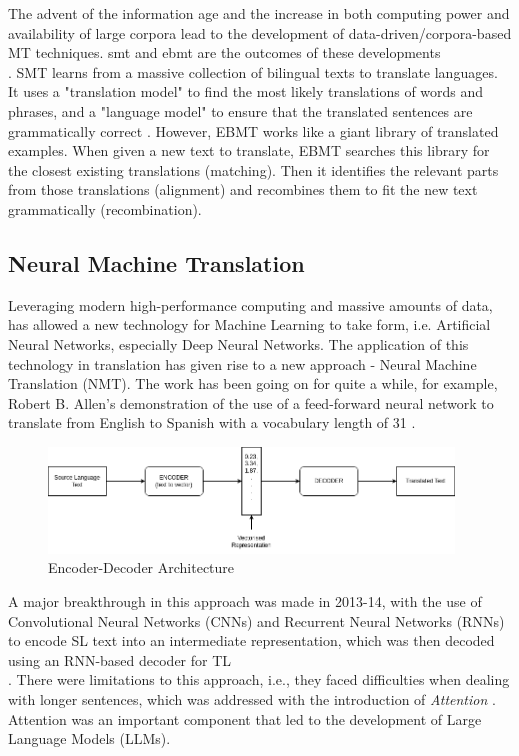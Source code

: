 The advent of the information age and the increase in both computing power and availability of large corpora lead to the development of data-driven/corpora-based MT techniques. \gls{smt} and \gls{ebmt} are the outcomes of these developments \\ \cite{baker2019routledge}. SMT learns from a massive collection of bilingual texts to translate languages. It uses a "translation model" to find the most likely translations of words and phrases, and a "language model" to ensure that the translated sentences are grammatically correct \cite{hutchins2006future}. However, EBMT works like a giant library of translated examples. When given a new text to translate, EBMT searches this library for the closest existing translations (matching). Then it identifies the relevant parts from those translations (alignment) and recombines them to fit the new text grammatically (recombination).


\subsection{Neural Machine Translation}

Leveraging modern high-performance computing and massive amounts of data, has allowed a new technology for Machine Learning to take form, i.e. Artificial Neural Networks, especially Deep Neural Networks. The application of this technology in translation has given rise to a new approach - Neural Machine Translation (NMT). The work has been going on for quite a while, for example, Robert B. Allen's demonstration of the use of a feed-forward neural network to translate from English to Spanish with a vocabulary length of 31 \cite{allen1987several}.

\begin{figure}[h]
    \centering
    \includegraphics[width=0.96\textwidth]{images/EncoderDecoder.png}
    \caption{Encoder-Decoder Architecture}
    \label{fig:encode-decode}
\end{figure}

A major breakthrough in this approach was made in 2013-14, with the use of Convolutional Neural Networks (CNNs) and Recurrent Neural Networks (RNNs) to encode SL text into an intermediate representation, which was then decoded using an RNN-based decoder for TL \cite{kalchbrenner2013recurrent} \\ \cite{cho2014learning} \cite{sutskever2014sequence}. There were limitations to this approach, i.e., they faced difficulties when dealing with longer sentences, which was addressed with the introduction of {\itshape Attention} \cite{bahdanau2014neural}. Attention was an important component that led to the development of Large Language Models (LLMs).

